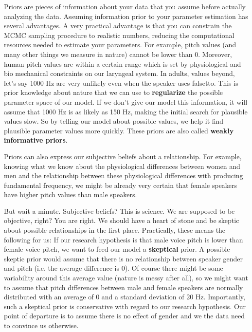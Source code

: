 \documentclass[nobib]{tufte-handout}
\begin{document}
Priors are pieces of information about your data that you assume before actually analyzing the data. Assuming information prior to your parameter estimation has several advantages. A very practical advantage is that you can constrain the MCMC sampling procedure to realistic numbers, reducing the computational resources needed to estimate your parameters. For example, pitch values (and many other things we measure in nature) cannot be lower than 0. Moreover, human pitch values are within a certain range which is set by physiological and bio mechanical constraints on our laryngeal system. In adults, values beyond, let's say 1000 Hz are very unlikely even when the speaker uses falsetto. This is prior knowledge about nature that we can use to \textbf{regularize} the possible parameter space of our model. If we don't give our model this information, it will assume that 1000 Hz is as likely as 150 Hz, making the initial search for plausible values slow. So by telling our model about possible values, we help it find plausible parameter values more quickly. These priors are also called \textbf{weakly informative priors}. 
 
Priors can also express our subjective beliefs about a relationship. For example, knowing what we know about the physiological differences between women and men and the relationship between these physiological differences with producing fundamental frequency, we might be already very certain that female speakers have higher pitch values than male speakers.

But wait a minute. Subjective beliefs? This is science. We are supposed to be objective, right? You are right. We should have a heart of stone and be skeptic about possible relationships in the first place. Practically, these means the following for us: If our research hypothesis is that male voice pitch is lower than female voice pitch, we want to feed our model a \textbf{skeptical} prior. A possible skeptic prior would assume that there is no relationship between speaker gender and pitch (i.e. the average difference is 0). Of course there might be some variability around this average value (nature is messy after all), so we might want to assume that pitch differences between male and female speakers are normally distributed with an average of 0 and a standard deviation of 20 Hz. Importantly, such a skeptical prior is conservative with regard to our research hypothesis. Our point of departure is to assume there is no effect of gender and we the data need to convince us otherwise.
\end{document}
